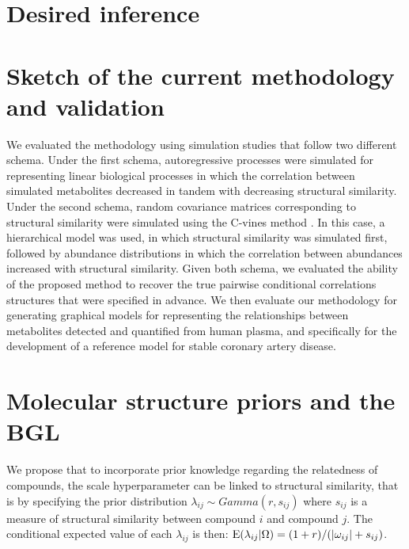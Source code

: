 \label{structureADBGL}
\begin{DoubleSpace*}

\section{Desired inference}

\section{Sketch of the current methodology and validation}
We evaluated the methodology using simulation studies that follow two different schema. Under the first schema, autoregressive processes were simulated for representing linear biological processes in which the correlation between simulated metabolites decreased in tandem with decreasing structural similarity. Under the second schema, random covariance matrices corresponding to structural similarity were simulated using the C-vines method \cite{lewandowski2009}. In this case, a hierarchical model was used, in which structural similarity was simulated first, followed by abundance distributions in which the correlation between abundances increased with structural similarity. Given both schema, we evaluated the ability of the proposed method to recover the true pairwise conditional correlations structures that were specified in advance. We then evaluate our methodology for generating graphical models for representing the relationships between metabolites detected and quantified from human plasma, and specifically for the development of a reference model for stable coronary artery disease.  

\section{Molecular structure priors and the BGL}
We propose that to incorporate prior knowledge regarding the relatedness of compounds, the scale hyperparameter can be linked to structural similarity, that is by specifying the prior distribution $\lambda_{ij}\sim Gamma(r,s_{ij})$ where $s_{ij}$ is a measure of structural similarity between compound $i$ and compound $j$. The conditional expected value of each $\lambda_{ij}$ is then: $\operatorname{E}(\lambda_{ij}|\Omega)=(1+r)/(|\omega_{ij} |+s_{ij})$.


\end{DoubleSpace*}
